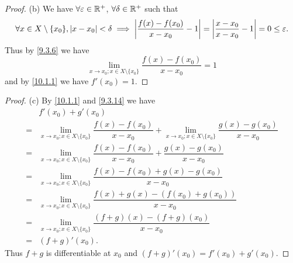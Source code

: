 \begin{proof}{(b)}
  We have \(\forall \varepsilon \in \mathbb{R}^+\), \(\forall \delta \in \mathbb{R}^+\) such that
  \[
    \forall x \in X \setminus \{x_0\}, \left\lvert x - x_0\right\rvert < \delta \implies \left\lvert\dfrac{f(x) - f(x_0)}{x - x_0} - 1\right\rvert = \left\lvert\dfrac{x - x_0}{x - x_0} - 1\right\rvert = 0 \leq \varepsilon.
  \]
  Thus by \cref{9.3.6} we have
  \[
    \lim_{x \to x_0 ; x \in X \setminus \{x_0\}} \dfrac{f(x) - f(x_0)}{x - x_0} = 1
  \]
  and by \cref{10.1.1} we have \(f'(x_0) = 1\).
\end{proof}

\begin{proof}{(c)}
  By \cref{10.1.1} and \cref{9.3.14} we have
  \begin{align*}
      & f'(x_0) + g'(x_0)                                                                                                                                         \\
    = & \lim_{x \to x_0 ; x \in X \setminus \{x_0\}} \dfrac{f(x) - f(x_0)}{x - x_0} + \lim_{x \to x_0 ; x \in X \setminus \{x_0\}} \dfrac{g(x) - g(x_0)}{x - x_0} \\
    = & \lim_{x \to x_0 ; x \in X \setminus \{x_0\}} \dfrac{f(x) - f(x_0)}{x - x_0} + \dfrac{g(x) - g(x_0)}{x - x_0}                                              \\
    = & \lim_{x \to x_0 ; x \in X \setminus \{x_0\}} \dfrac{f(x) - f(x_0) + g(x) - g(x_0)}{x - x_0}                                                               \\
    = & \lim_{x \to x_0 ; x \in X \setminus \{x_0\}} \dfrac{f(x) + g(x) - (f(x_0) + g(x_0))}{x - x_0}                                                             \\
    = & \lim_{x \to x_0 ; x \in X \setminus \{x_0\}} \dfrac{(f + g)(x) - (f + g)(x_0)}{x - x_0}                                                                   \\
    = & (f + g)'(x_0).
  \end{align*}
  Thus \(f + g\) is differentiable at \(x_0\) and \((f + g)'(x_0) = f'(x_0) + g'(x_0)\).
\end{proof}

